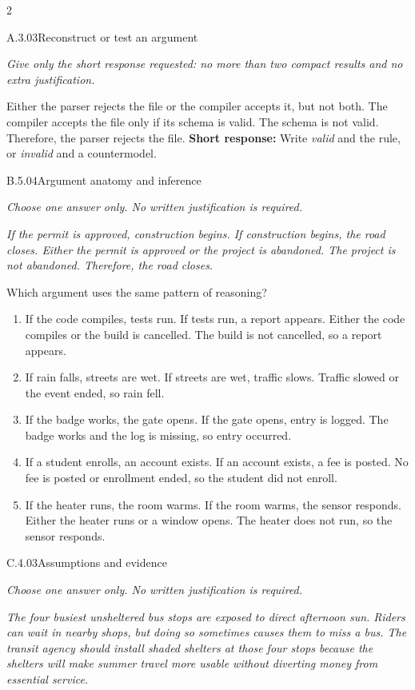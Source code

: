 \documentclass[9pt]{extarticle}
\newcommand{\choice}[1]{\item #1}
\begin{document}
\begin{multicols}{2}
\begin{DenseCoreProblem}{A.3.03}{Reconstruct or test an argument}
{\scriptsize\textit{Give only the short response requested: no more than two compact results and no extra justification.}\par}
Either the parser rejects the file or the compiler accepts it, but not both. The compiler accepts the file only if its schema is valid. The schema is not valid. Therefore, the parser rejects the file.
\textbf{Short response:} Write \emph{valid} and the rule, or \emph{invalid} and a countermodel.
\end{DenseCoreProblem}
\begin{DenseCoreProblem}{B.5.04}{Argument anatomy and inference}
{\scriptsize\textit{Choose one answer only. No written justification is required.}\par}
\emph{If the permit is approved, construction begins. If construction begins, the road closes. Either the permit is approved or the project is abandoned. The project is not abandoned. Therefore, the road closes.}

Which argument uses the same pattern of reasoning?
\begin{enumerate}[label=(\alph*)]
  \choice{If the code compiles, tests run. If tests run, a report appears. Either the code compiles or the build is cancelled. The build is not cancelled, so a report appears.}
  \choice{If rain falls, streets are wet. If streets are wet, traffic slows. Traffic slowed or the event ended, so rain fell.}
  \choice{If the badge works, the gate opens. If the gate opens, entry is logged. The badge works and the log is missing, so entry occurred.}
  \choice{If a student enrolls, an account exists. If an account exists, a fee is posted. No fee is posted or enrollment ended, so the student did not enroll.}
  \choice{If the heater runs, the room warms. If the room warms, the sensor responds. Either the heater runs or a window opens. The heater does not run, so the sensor responds.}
\end{enumerate}
\end{DenseCoreProblem}
\columnbreak
\begin{DenseCoreProblem}{C.4.03}{Assumptions and evidence}
{\scriptsize\textit{Choose one answer only. No written justification is required.}\par}
\emph{The four busiest unsheltered bus stops are exposed to direct afternoon sun. Riders can wait in nearby shops, but doing so sometimes causes them to miss a bus. The transit agency should install shaded shelters at those four stops because the shelters will make summer travel more usable without diverting money from essential service.}


\end{DenseCoreProblem}
\end{multicols}
\end{document}

